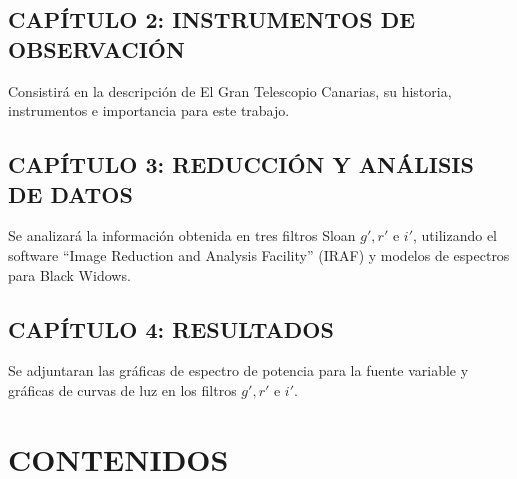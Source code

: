 \section*{CAP\'ITULO 2: INSTRUMENTOS DE OBSERVACIÓN}
Consistir\'a en la descripción de El Gran Telescopio Canarias, su historia, instrumentos e importancia para este trabajo.

\section*{CAP\'ITULO 3: REDUCCIÓN Y ANÁLISIS DE DATOS}
Se analizar\'a la información obtenida en tres filtros Sloan $g', r'$ e $i'$, utilizando el software ``Image Reduction and Analysis Facility'' (IRAF) y modelos de espectros para Black Widows. 

\section*{CAP\'ITULO 4: RESULTADOS}
Se adjuntaran las gráficas de espectro de potencia para la fuente variable y gráficas de curvas de luz en los filtros $g', r'$ e $i'$.

\chapter{CONTENIDOS}


